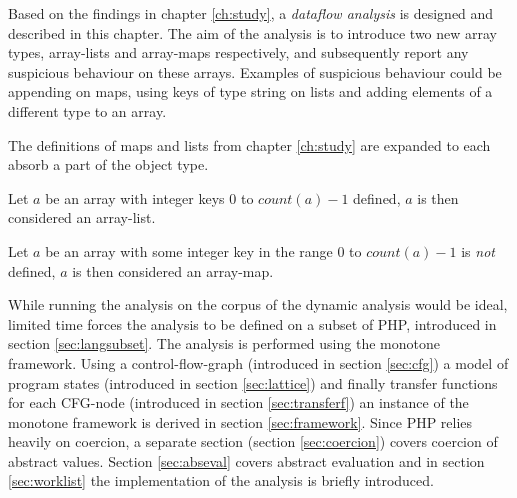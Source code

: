 Based on the findings in chapter \ref{ch:study}, a \emph{dataflow analysis} is designed and described in this chapter. The aim of the analysis is to introduce two new array types, array-lists and array-maps respectively, and subsequently report any suspicious behaviour on these arrays. Examples of suspicious behaviour could be appending on maps, using keys of type string on lists and adding elements of a different type to an array.

The definitions of maps and lists from chapter \ref{ch:study} are expanded to each absorb a part of the object type.

\begin{definition}
Let $a$ be an array with integer keys $0$ to $\mathit{count}(a)-1$ defined, $a$ is then considered an array-list.
\end{definition}

\begin{definition}
Let $a$ be an array with some integer key in the range $0$ to $\mathit{count}(a)-1$ is \emph{not} defined, $a$ is then considered an array-map.
\end{definition}

While running the analysis on the corpus of the dynamic analysis would be ideal, limited time forces the analysis to be defined on a subset of PHP, introduced in section \ref{sec:langsubset}. The analysis is performed using the monotone framework. Using a control-flow-graph (introduced in section \ref{sec:cfg}) a model of program states (introduced in section \ref{sec:lattice}) and finally transfer functions for each CFG-node (introduced in section \ref{sec:transferf}) an instance of the monotone framework is derived in section \ref{sec:framework}. Since PHP relies heavily on coercion, a separate section (section \ref{sec:coercion}) covers coercion of abstract values. Section \ref{sec:abseval} covers abstract evaluation and in section \ref{sec:worklist} the implementation of the analysis is briefly introduced.
